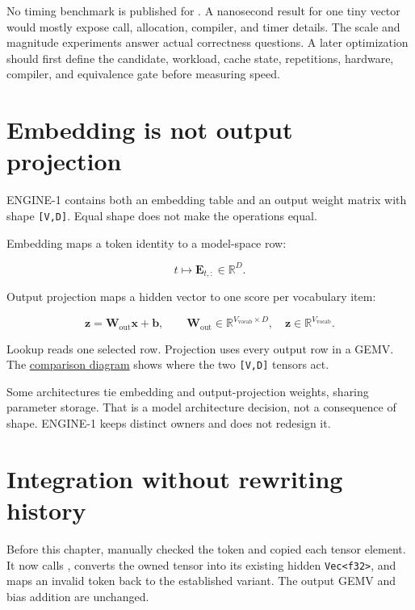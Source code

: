No timing benchmark is published for . A nanosecond result for
one tiny vector would mostly expose call, allocation, compiler, and
timer details. The scale and magnitude experiments answer actual
correctness questions. A later optimization should first define the
candidate, workload, cache state, repetitions, hardware, compiler, and
equivalence gate before measuring speed.

\section{Embedding is not output
projection}\label{embedding-is-not-output-projection}

ENGINE-1 contains both an embedding table and an output weight matrix
with shape \texttt{{[}V,D{]}}. Equal shape does not make the operations
equal.

Embedding maps a token identity to a model-space row:

\begin{equation}
t\longmapsto\mathbf{E}_{t,:}\in\mathbb{R}^{D}.
\end{equation}

Output projection maps a hidden vector to one score per vocabulary item:

\begin{equation}
\mathbf{z}=\mathbf{W}_{\mathrm{out}}\mathbf{x}+\mathbf{b},
\qquad
\mathbf{W}_{\mathrm{out}}\in
\mathbb{R}^{V_{\mathrm{vocab}}\times D},
\quad
\mathbf{z}\in\mathbb{R}^{V_{\mathrm{vocab}}}.
\end{equation}

Lookup reads one selected row. Projection uses every output row in a
GEMV. The
\href{https://github.com/hermonai/inside-the-llm-engine/blob/astra-visual-rewrite/diagrams/transformer/embedding-vs-output-projection.txt}{comparison
diagram} shows where the two \texttt{{[}V,D{]}} tensors act.

Some architectures tie embedding and output-projection weights, sharing
parameter storage. That is a model architecture decision, not a
consequence of shape. ENGINE-1 keeps distinct owners and  does
not redesign it.

\section{Integration without rewriting
history}\label{integration-without-rewriting-history}

Before this chapter,
\texttt{} manually checked
the token and copied each tensor element. It now calls
\texttt{}, converts the owned
tensor into its existing hidden
\texttt{Vec\textless{}f32\textgreater{}}, and maps an invalid token back
to the established \texttt{}
variant. The output GEMV and bias addition are unchanged.

